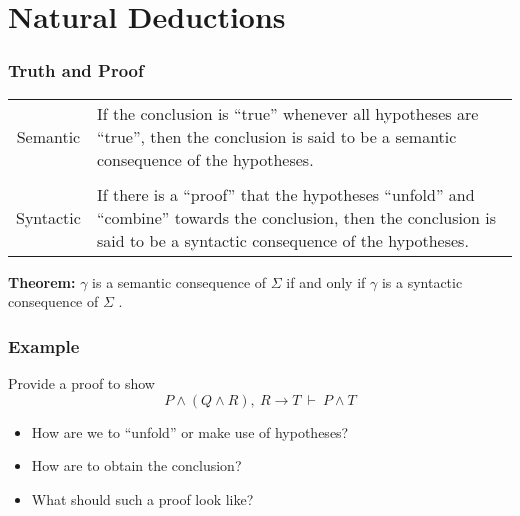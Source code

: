 \documentclass{beamer}
\theoremstyle{indentDefn} \newtheorem{defn}[]{Definition}
\begin{document}
\section{Natural Deductions}

\begin{frame}
	\frametitle{Truth and Proof}

	\begin{table}[h]
		\centering
		\begin{tabular}{c  p{}}
		Semantic & If the conclusion is ``true'' whenever all hypotheses are ``true'', then the conclusion is said to be a semantic consequence of the hypotheses. \\

		\vspace{0.2cm} & \\

		Syntactic & If there is a ``proof'' that the hypotheses ``unfold'' and ``combine'' towards the conclusion, then the conclusion is said to be a syntactic consequence of the hypotheses. 
		\end{tabular}
	\end{table}

	\vspace{0.5cm}

	{\bf Theorem:} $\gamma$ is a semantic consequence of $\Sigma$ if and only if $\gamma$ is a syntactic consequence of $\Sigma$ \cite{vDalen}. 	
\end{frame}

\begin{frame}
	\frametitle{Example}
	Provide a proof to show $$P \land (Q \land R), \ R \to T  \ \vdash \ P \land T$$

	\vspace{4cm}

	\begin{itemize}
		\item How are we to ``unfold'' or make use of hypotheses? 
		\item How are to obtain the conclusion? 
		\item What should such a proof look like? 
	\end{itemize}
\end{frame}
\end{document}
